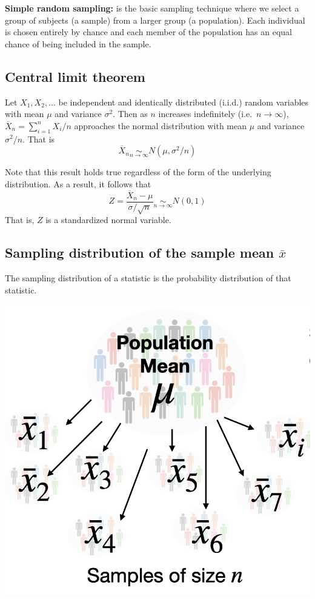 \documentclass[
]{article}
\begin{document}
\textbf{Simple random sampling:} is the basic sampling technique where
we select a group of subjects (a sample) from a larger group (a
population). Each individual is chosen entirely by chance and each
member of the population has an equal chance of being included in the
sample.

\hypertarget{central-limit-theorem}{%
\subsection{Central limit theorem}\label{central-limit-theorem}}

Let \(X_1, X_2, \ldots\) be independent and identically distributed
(i.i.d.) random variables with mean \(\mu\) and variance \(\sigma^2\).
Then as \(n\) increases indefinitely (i.e.~\(n\rightarrow\infty\)),
\(\overline{X}_n=\sum_{i=1}^{n}X_i/n\) approaches the normal
distribution with mean \(\mu\) and variance \(\sigma^2/n\). That is
\[\overline{X}_n \underset{n\rightarrow\infty}{\sim} N(\mu, \sigma^2/n)\]

Note that this result holds true regardless of the form of the
underlying distribution. As a result, it follows that
\[Z=\frac{\overline{X}_n-\mu}{\sigma/\sqrt{n}}\underset{n\rightarrow\infty}{\sim} N(0,1)\]
That is, \(Z\) is a standardized normal variable.
 
\hypertarget{sampling-distribution-of-the-sample-mean-barx}{%
\subsection{\texorpdfstring{Sampling distribution of the sample mean
\(\bar{x}\)}{Sampling distribution of the sample mean \textbackslash bar\{x\}}}\label{sampling-distribution-of-the-sample-mean-barx}}

The sampling distribution of a statistic is the probability distribution
of that statistic.

\begin{center}\includegraphics[width=0.8\linewidth,height=0.8\textheight]{stat4} \end{center}
\end{document}
